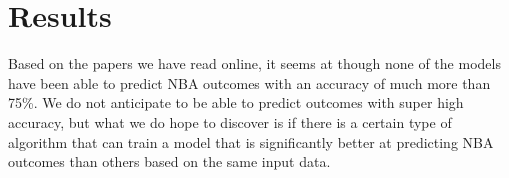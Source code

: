\documentclass[letterpaper]{article} %
\begin{document}

\section{Results}

Based on the papers we have read online, it seems at though none of the models have been able to predict NBA outcomes with an accuracy of much more than 75\%. We do not anticipate to be able to predict outcomes with super high accuracy, but what we do hope to discover is if there is a certain type of algorithm that can train a model that is significantly better at predicting NBA outcomes than others based on the same input data.

\newpage


\end{document}

